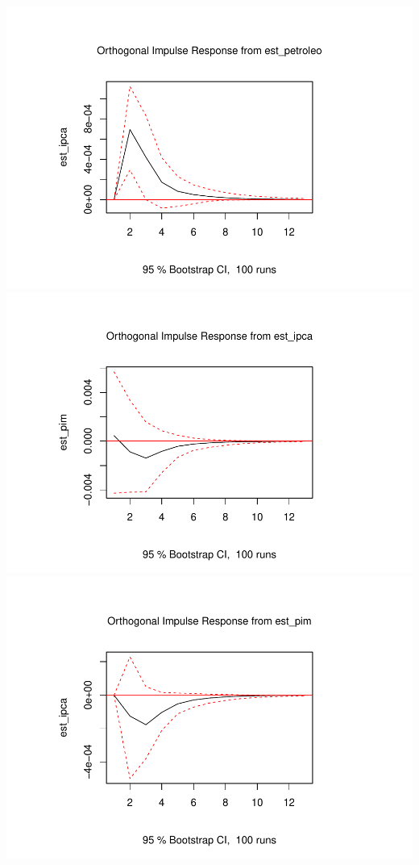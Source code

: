 \documentclass[12pt]{article}
\begin{document}
\includegraphics{article_files/figure-latex/unnamed-chunk-14-4.pdf}
\includegraphics{article_files/figure-latex/unnamed-chunk-14-5.pdf}
\includegraphics{article_files/figure-latex/unnamed-chunk-14-6.pdf}
\end{document}
